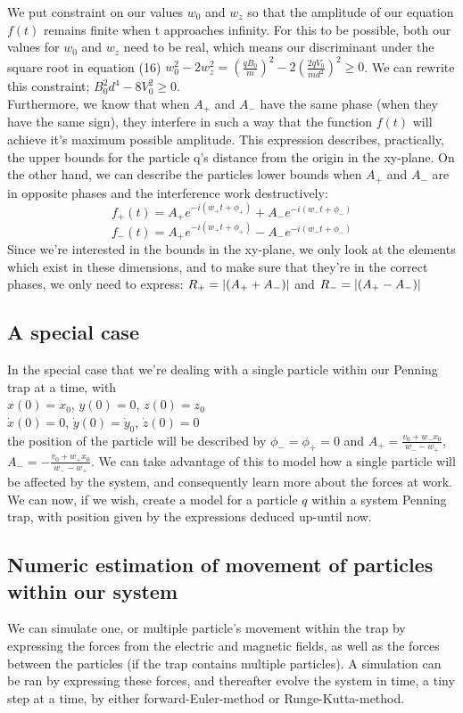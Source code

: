 \documentclass[english,notitlepage,reprint,nofootinbib,twocolumn]{article}
\begin{document}
We put constraint on our values $w_0$ and $w_z$ so that the amplitude of our equation $f(t)$ remains finite when t approaches infinity. For this to be possible, both our values for $w_0$ and $w_z$ need to be real, which means our discriminant under the square root in equation (16) ${w_0^2-2w_z^2}=( \frac{qB_0}{m})^2-2(\frac{2qV_0}{md^2})^2 \geq 0$. We can rewrite this constraint; $B_0^2 d^4-8V_0^2 \geq 0$. \\

Furthermore, we know that when $A_+$ and $A_-$ have the same phase (when they have the same sign), they interfere in such a way that the function $f(t)$ will achieve it's maximum possible amplitude. This expression describes, practically, the upper bounds for the particle q's distance from the origin in the xy-plane. On the other hand, we can describe the particles lower bounds when $A_+$ and $A_-$ are in opposite phases and the interference work destructively:\\
$$f_+(t)=A_+e^{-i(w_+t+\phi_+)}+A_-e^{-i(w_-t+\phi_-)}$$
$$f_-(t)=A_+e^{-i(w_+t+\phi_+)}-A_-e^{-i(w_-t+\phi_-)}$$ 
Since we're interested in the bounds in the xy-plane, we only look at the elements which exist in these dimensions, and to make sure that they're in the correct phases, we only need to express: 
$R_+=\abs{(A_+ + A_-)}$ and $R_-=\abs{(A_+ - A_-)}$ \\


\subsection{A special case}
In the special case that we're dealing with a single particle within our Penning trap at a time, with\\ $x(0)=x_0$, $y(0)=0$, $z(0)=z_0$\\
$\dot{x}(0)=0$, $\dot{y}(0)=\dot{y}_0$, $\dot{z}(0)=0$\\ the position of the particle will be described by $\phi_- = \phi_+ = 0$ and $A_+=\frac{v_0+w_-x_0}{w_--w_+}$, $A_-=-\frac{v_0+w_+x_0}{w_--w_+}$. 
We can take advantage of this to model how a single particle will be affected by the system, and consequently learn more about the forces at work.  \\

We can now, if we wish, create a model for a particle $q$ within a system Penning trap, with position given by the expressions deduced up-until now.

\subsection{Numeric estimation of movement of particles within our system}
We can simulate one, or multiple particle's movement within the trap by expressing the forces from the electric and magnetic fields, as well as the forces between the particles (if the trap contains multiple particles). A simulation can be ran by expressing these forces, and thereafter evolve the system in time, a tiny step at a time, by either forward-Euler-method or Runge-Kutta-method. \\
\end{document}
